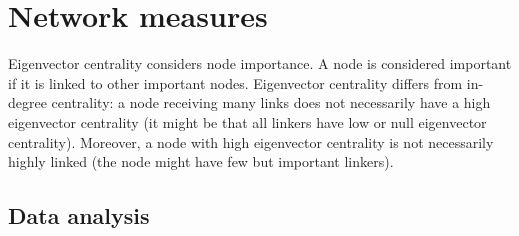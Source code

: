  



\section{Network measures}

Eigenvector centrality considers node importance. A node is considered important if it is linked to other important nodes. Eigenvector centrality differs from in-degree centrality: a node receiving many links does not necessarily have a high eigenvector centrality (it might be that all linkers have low or null eigenvector centrality). Moreover, a node with high eigenvector centrality is not necessarily highly linked (the node might have few but important linkers). 

\subsection{Data analysis}

